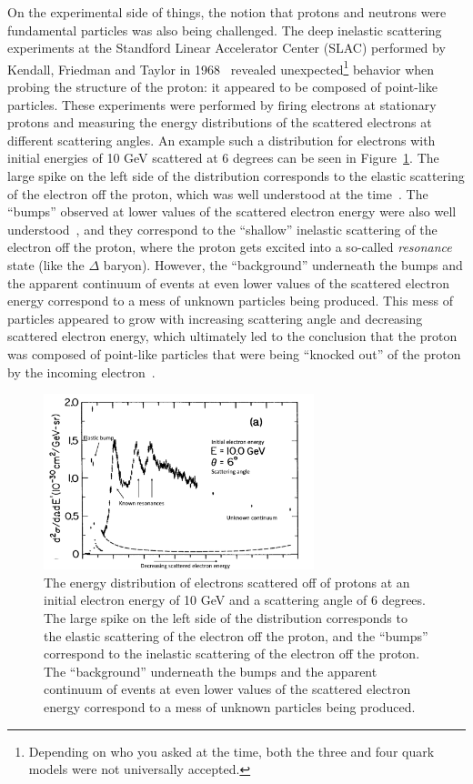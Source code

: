 On the experimental side of things, the notion that protons and neutrons were fundamental particles was also being challenged. The deep inelastic scattering experiments at the Standford Linear Accelerator Center (SLAC) performed by Kendall, Friedman and Taylor in 1968~\cite{Kendall, Friedman, Taylor} revealed unexpected\footnote{Depending on who you asked at the time, both the three and four quark models were not universally accepted.} behavior when probing the structure of the proton: it appeared to be composed of point-like particles. These experiments were performed by firing electrons at stationary protons and measuring the energy distributions of the scattered electrons at different scattering angles. An example such a distribution for electrons with initial energies of 10 GeV scattered at 6 degrees can be seen in Figure~\ref{fig:dis}. The large spike on the left side of the distribution corresponds to the elastic scattering of the electron off the proton, which was well understood at the time~\cite{ElasticScattering}. The ``bumps'' observed at lower values of the scattered electron energy were also well understood~\cite{Resonances}, and they correspond to the ``shallow'' inelastic scattering of the electron off the proton, where the proton gets excited into a so-called \textit{resonance} state (like the $\Delta$ baryon). However, the ``background'' underneath the bumps and the apparent continuum of events at even lower values of the scattered electron energy correspond to a mess of unknown particles being produced. This mess of particles appeared to grow with increasing scattering angle and decreasing scattered electron energy, which ultimately led to the conclusion that the proton was composed of point-like particles that were being ``knocked out'' of the proton by the incoming electron~\cite{Kendall}.

\begin{figure}[ht]
    \centering
    \includegraphics[width=0.7\textwidth]{figures/introduction/DeepInelasticScattering.png}
    \caption{The energy distribution of electrons scattered off of protons at an initial electron energy of 10 GeV and a scattering angle of 6 degrees. The large spike on the left side of the distribution corresponds to the elastic scattering of the electron off the proton, and the ``bumps'' correspond to the inelastic scattering of the electron off the proton. The ``background'' underneath the bumps and the apparent continuum of events at even lower values of the scattered electron energy correspond to a mess of unknown particles being produced.}
    \label{fig:dis}
\end{figure}

